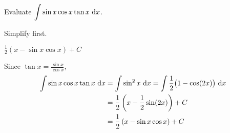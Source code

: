 \begin{question}
Evaluate $\displaystyle\int \sin x \cos x \tan x~\mathrm{d}x$.
\end{question}
\begin{hint}
Simplify first.
\end{hint}
\begin{answer}
$\displaystyle\frac12\left(x -\sin x \cos x \right)+C$
\end{answer}
\begin{solution} Since $\tan x =\frac{\sin x}{\cos x}$,
\begin{align*}
\int \sin x \cos x \tan x~\mathrm{d}x&=\int \sin^2 x~\mathrm{d}x = \int \frac{1}{2}\big(1-\cos(2x) \big)~\mathrm{d}x\\
&=\frac12\left(x - \frac{1}{2}\sin(2x) \right)+C
\\&=\frac12\left(x -\sin x \cos x \right)+C
\end{align*}
\end{solution}




